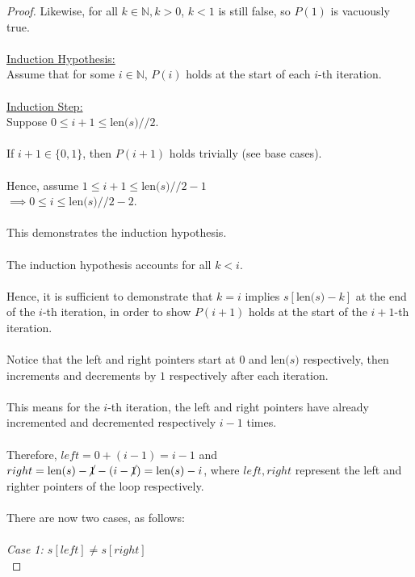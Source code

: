\documentclass[12pt]{article}
\begin{document}
\begin{proof}
    Likewise, for all $k \in \mathbb{N}, k > 0$, $k < 1$ is still false, so $P(1)$ is vacuously true. \\
    \\
    \underline{Induction Hypothesis:} \\
    Assume that for some $i \in \mathbb{N}$, $P(i)$ holds at the start of each $i$-th iteration. \\
    \\
    \underline{Induction Step:} \\
    Suppose $0 \leq i + 1 \leq \text{len($s$)} // 2$. \\
    \\
    If $i + 1 \in \{0, 1\}$, then $P(i + 1)$ holds trivially (see base cases). \\
    \\
    Hence, assume $1 \leq i + 1 \leq \text{len($s$)} // 2 - 1$ \\
    $\implies 0 \leq i \leq \text{len($s$)} // 2 - 2$. \\
    \\
    This demonstrates the induction hypothesis. \\
    \\
    The induction hypothesis accounts for all $k < i$. \\
    \\
    Hence, it is sufficient to demonstrate that $k = i$ implies $s[\text{len($s$)} - k]$ at the end of the $i$-th iteration, in order to show $P(i + 1)$ holds at the start of the $i + 1$-th iteration.\\
    \\
    Notice that the left and right pointers start at $0$ and $\text{len($s$)}$ respectively, then increments and decrements by $1$ respectively after each iteration. \\
    \\
    This means for the $i$-th iteration, the left and right pointers have already incremented and decremented respectively $i - 1$ times. \\
    \\
    Therefore, $left = 0 + (i - 1) = i - 1$ and $right = \text{len($s$)} - \cancel{1} - (i - \cancel{1}) = \text{len($s$)} - i$, where $left, right$ represent the left and righter pointers of the loop respectively. \\
    \\
    There are now two cases, as follows: \\
    \\
    \textit{Case 1: $s[left] \neq s[right]$} \\

\end{proof}
\end{document}
